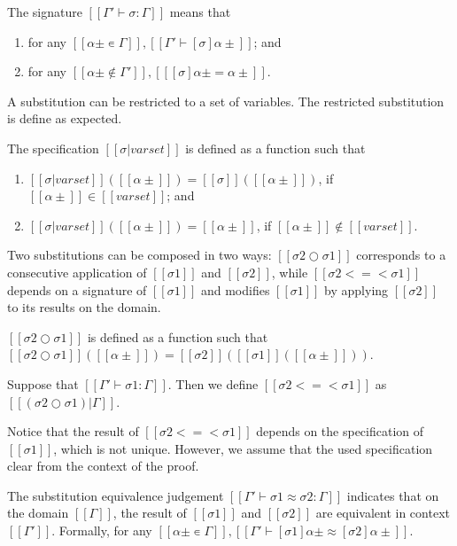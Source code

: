 \documentclass[a4,natbib=false]{article}
\begin{document}
\begin{definition}
  The signature $[[Γ' ⊢ σ : Γ]]$ means that
  \begin{enumerate}
    \item for any $[[α± ∊ Γ]], [[ Γ' ⊢ [σ]α± ]]$; and
    \item for any $[[α± ∉ Γ']], [[ [σ]α± = α± ]]$.
  \end{enumerate}
\end{definition}

A substitution can be restricted to a set of variables. 
The restricted substitution is define as expected. 
\begin{definition}
  The specification $[[σ  | varset]]$ is defined as
  a function such that 
  \begin{enumerate}
    \item $[[σ|varset]]([[α± ]]) = [[σ]]([[α± ]])$, if $[[α± ]] \in [[varset]]$; and
    \item $[[σ|varset]]([[α± ]]) = [[α± ]]$, if $[[α± ]] \notin [[varset]]$.
  \end{enumerate}
\end{definition}

Two substitutions can be composed in two ways:
$[[σ2 ○ σ1]]$ corresponds to a consecutive application of $[[σ1]]$ and $[[σ2]]$,
while $[[σ2 <=< σ1]]$
depends on a signature of $[[σ1]]$ and modifies $[[σ1]]$ by applying
$[[σ2]]$ to its results on the domain.
\begin{definition}
  $[[σ2 ○ σ1]]$ is defined as a function such that
  $[[σ2 ○ σ1]]([[α± ]]) = [[σ2]]([[σ1]]([[α± ]]))$.
\end{definition}

\begin{definition}
  Suppose that $[[Γ' ⊢ σ1 : Γ]]$.
  Then we define $[[σ2 <=< σ1]]$ as $[[(σ2 ○ σ1)|Γ]]$.
\end{definition}
Notice that the result of $[[σ2 <=< σ1]]$ depends on the 
specification of $[[σ1]]$, which is not unique. 
However, we assume that the used specification clear from the 
context of the proof. 

\begin{definition}
  The substitution equivalence judgement $[[Γ' ⊢ σ1 ≈ σ2 : Γ]]$ 
  indicates that on the domain $[[Γ]]$, 
  the result of $[[σ1]]$ and $[[σ2]]$ are equivalent in context $[[Γ']]$.
  Formally, for any $[[α± ∊ Γ]], [[ Γ' ⊢ [σ1]α± ≈ [σ2]α± ]]$.
\end{definition}
\end{document}
